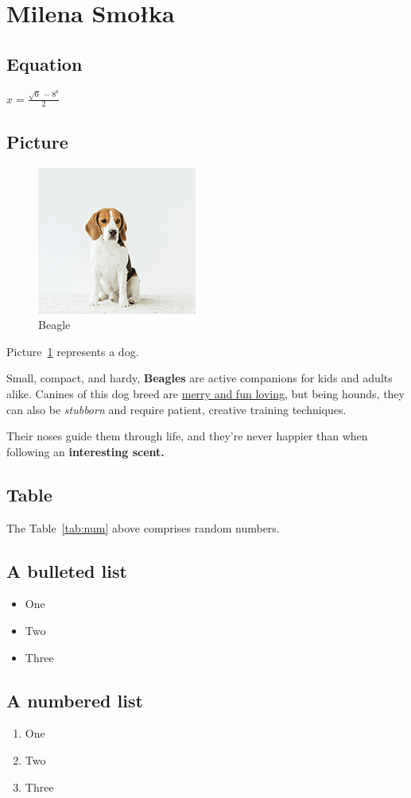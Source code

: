 \newpage
\section{Milena Smołka}
\label{sec:milenasmolka}

\subsection{Equation}
\begin{center}
    $x=\frac{\sqrt{6}\ - 8^{8}}{2}\ $
\end{center} 

\subsection{Picture}
\begin{figure}[htbp]
    \centering
    \includegraphics{Pictures/pies.png}
    \caption{Beagle}
    \label{fig:pies}
\end{figure}

Picture~\ref{fig:pies} represents a dog.

Small, compact, and hardy, \textbf{Beagles} are active companions for kids and adults alike. Canines of this dog breed are  \underline{merry and fun loving}, but being hounds, they can also be \emph{stubborn} and require patient, creative training techniques.\par

Their noses guide them through life, and they’re never happier than when following an \textbf{interesting scent.} \par


\subsection{Table}


The Table~\ref{tab:num} above comprises random numbers.

\subsection{A bulleted list}
\begin{itemize}
    \item One 
    \item Two
    \item Three
\end{itemize}
\subsection{A numbered list}
\begin{enumerate}
    \item One
    \item Two
    \item Three
\end{enumerate}